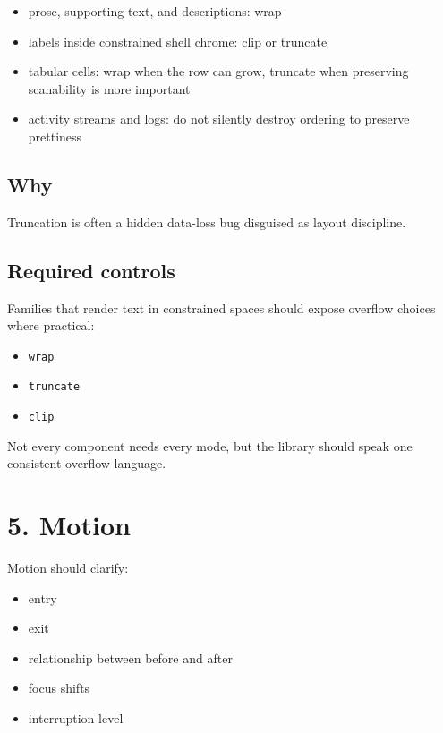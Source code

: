\begin{itemize}
\tightlist
\item
  prose, supporting text, and descriptions: wrap
\item
  labels inside constrained shell chrome: clip or truncate
\item
  tabular cells: wrap when the row can grow, truncate when preserving scanability is more important
\item
  activity streams and logs: do not silently destroy ordering to preserve prettiness
\end{itemize}

\subsection{Why}\label{record-021-why}

Truncation is often a hidden data-loss bug disguised as layout discipline.

\subsection{Required controls}\label{record-021-required-controls}

Families that render text in constrained spaces should expose overflow choices where practical:

\begin{itemize}
\tightlist
\item
  \texttt{w\allowbreak{}r\allowbreak{}a\allowbreak{}p}
\item
  \texttt{t\allowbreak{}r\allowbreak{}u\allowbreak{}n\allowbreak{}c\allowbreak{}a\allowbreak{}t\allowbreak{}e}
\item
  \texttt{c\allowbreak{}l\allowbreak{}i\allowbreak{}p}
\end{itemize}

Not every component needs every mode, but the library should speak one consistent overflow language.

\section{5. Motion}\label{record-021-motion}

Motion should clarify:

\begin{itemize}
\tightlist
\item
  entry
\item
  exit
\item
  relationship between before and after
\item
  focus shifts
\item
  interruption level
\end{itemize}


